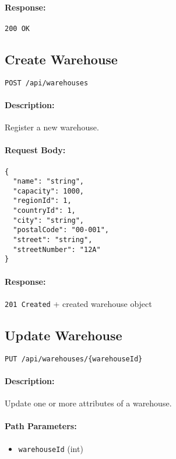 \documentclass[a4paper,11pt]{article}
\begin{document}
\paragraph{Response:} \texttt{200 OK}

\subsection{Create Warehouse}
\label{sec:warehouses-create}
\begin{verbatim}
POST /api/warehouses
\end{verbatim}
\paragraph{Description:} Register a new warehouse.
\paragraph{Request Body:}
\begin{verbatim}
{
  "name": "string",
  "capacity": 1000,
  "regionId": 1,
  "countryId": 1,
  "city": "string",
  "postalCode": "00-001",
  "street": "string",
  "streetNumber": "12A"
}
\end{verbatim}
\paragraph{Response:} \texttt{201 Created} + created warehouse object

\subsection{Update Warehouse}
\label{sec:warehouses-update}
\begin{verbatim}
PUT /api/warehouses/{warehouseId}
\end{verbatim}
\paragraph{Description:} Update one or more attributes of a warehouse.
\paragraph{Path Parameters:}
\begin{itemize}
  \item \texttt{warehouseId} (int)
\end{itemize}
\end{document}

